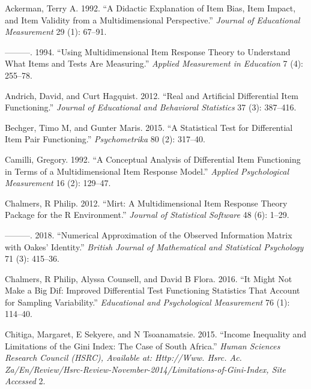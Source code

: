 \documentclass[
  11pt,
]{article}
\begin{document}



\hypertarget{refs}{}
\leavevmode\hypertarget{ref-ackerman1992didactic}{}%
Ackerman, Terry A. 1992. ``A Didactic Explanation of Item Bias, Item Impact, and Item Validity from a Multidimensional Perspective.'' \emph{Journal of Educational Measurement} 29 (1): 67--91.

\leavevmode\hypertarget{ref-ackerman1994using}{}%
---------. 1994. ``Using Multidimensional Item Response Theory to Understand What Items and Tests Are Measuring.'' \emph{Applied Measurement in Education} 7 (4): 255--78.

\leavevmode\hypertarget{ref-andrich2012real}{}%
Andrich, David, and Curt Hagquist. 2012. ``Real and Artificial Differential Item Functioning.'' \emph{Journal of Educational and Behavioral Statistics} 37 (3): 387--416.

\leavevmode\hypertarget{ref-bechger2015statistical}{}%
Bechger, Timo M, and Gunter Maris. 2015. ``A Statistical Test for Differential Item Pair Functioning.'' \emph{Psychometrika} 80 (2): 317--40.

\leavevmode\hypertarget{ref-camilli1992conceptual}{}%
Camilli, Gregory. 1992. ``A Conceptual Analysis of Differential Item Functioning in Terms of a Multidimensional Item Response Model.'' \emph{Applied Psychological Measurement} 16 (2): 129--47.

\leavevmode\hypertarget{ref-chalmers2012mirt}{}%
Chalmers, R Philip. 2012. ``Mirt: A Multidimensional Item Response Theory Package for the R Environment.'' \emph{Journal of Statistical Software} 48 (6): 1--29.

\leavevmode\hypertarget{ref-chalmers2018numerical}{}%
---------. 2018. ``Numerical Approximation of the Observed Information Matrix with Oakes' Identity.'' \emph{British Journal of Mathematical and Statistical Psychology} 71 (3): 415--36.

\leavevmode\hypertarget{ref-chalmers2016might}{}%
Chalmers, R Philip, Alyssa Counsell, and David B Flora. 2016. ``It Might Not Make a Big Dif: Improved Differential Test Functioning Statistics That Account for Sampling Variability.'' \emph{Educational and Psychological Measurement} 76 (1): 114--40.

\leavevmode\hypertarget{ref-chitiga2015income}{}%
Chitiga, Margaret, E Sekyere, and N Tsoanamatsie. 2015. ``Income Inequality and Limitations of the Gini Index: The Case of South Africa.'' \emph{Human Sciences Research Council (HSRC), Available at: Http://Www. Hsrc. Ac. Za/En/Review/Hsrc-Review-November-2014/Limitations-of-Gini-Index, Site Accessed} 2.
\end{document}
